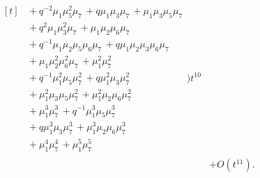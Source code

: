 \documentclass[10pt]{article}
\begin{document}
\[\begin{aligned}
\begin{aligned}[t]
  &{}+q^{-2}\mu_1\mu_5^{2}\mu_7\,+q\mu_1\mu_3\mu_7\,+\mu_1\mu_3\mu_5\mu_7 \\
  &{}+q^{2}\mu_1\mu_3^{2}\mu_7\,+\mu_1\mu_2\mu_6\mu_7 \\
  &{}+q^{-1}\mu_1\mu_2\mu_5\mu_6\mu_7\,+q\mu_1\mu_2\mu_3\mu_6\mu_7 \\
  &{}+\mu_1\mu_2^{2}\mu_6^{2}\mu_7\,+\mu_1^{2}\mu_7^{2} \\
  &{}+q^{-1}\mu_1^{2}\mu_5\mu_7^{2}\,+q\mu_1^{2}\mu_3\mu_7^{2} \\
  &{}+\mu_1^{2}\mu_3\mu_5\mu_7^{2}\,+\mu_1^{2}\mu_2\mu_6\mu_7^{2} \\
  &{}+\mu_1^{3}\mu_7^{3}\,+q^{-1}\mu_1^{3}\mu_5\mu_7^{3} \\
  &{}+q\mu_1^{3}\mu_3\mu_7^{3}\,+\mu_1^{3}\mu_2\mu_6\mu_7^{3} \\
  &{}+\mu_1^{4}\mu_7^{4}\,+\mu_1^{5}\mu_7^{5}\end{aligned}\Bigr)t^{10} \\
  &+ O(t^{11}).
\end{aligned}
\]
\end{document}
